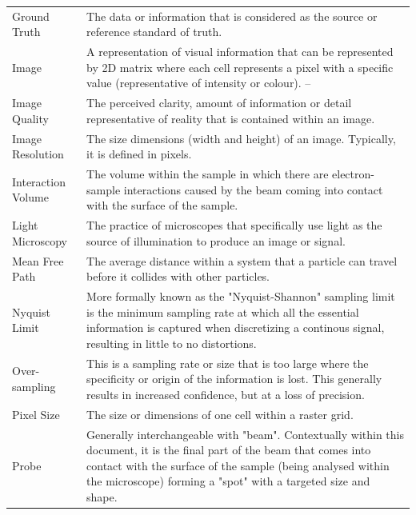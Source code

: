\documentclass[12pt]{article}
\begin{document}
\begin{center}
\begin{longtable}{p{4.25cm} p{11.25cm}}
        Ground Truth & The data or information that is considered as the source or reference standard of truth. \\
        
        Image & A representation of visual information that can be represented by 2D matrix where each cell represents a pixel with a specific value (representative of intensity or colour). -- \\
        
        Image Quality & The perceived clarity, amount of information or detail representative of reality that is contained within an image. \\
        
        Image Resolution & The size dimensions (width and height) of an image. Typically, it is defined in pixels. \\
        
        Interaction Volume & The volume within the sample in which there are electron-sample interactions caused by the beam coming into contact with the surface of the sample. \\
        
        Light Microscopy & The practice of microscopes that specifically use light as the source of illumination to produce an image or signal. \\

        Mean Free Path & The average distance within a system that a particle can travel before it collides with other particles.\\
        
        Nyquist Limit & More formally known as the "Nyquist-Shannon" sampling limit is the minimum sampling rate at which all the essential information is captured when discretizing a continous signal, resulting in little to no distortions. \\
        
        Over-sampling & This is a sampling rate or size that is too large where the specificity or origin of the information is lost. This generally results in increased confidence, but at a loss of precision.\\
        
        Pixel Size & The size or dimensions of one cell within a raster grid. \\
        
        Probe & Generally interchangeable with "beam". Contextually within this document, it is the final part of the beam that comes into contact with the surface of the sample (being analysed within the microscope) forming a "spot" with a targeted size and shape. \\
        

\end{longtable}
\end{center}
\end{document}
